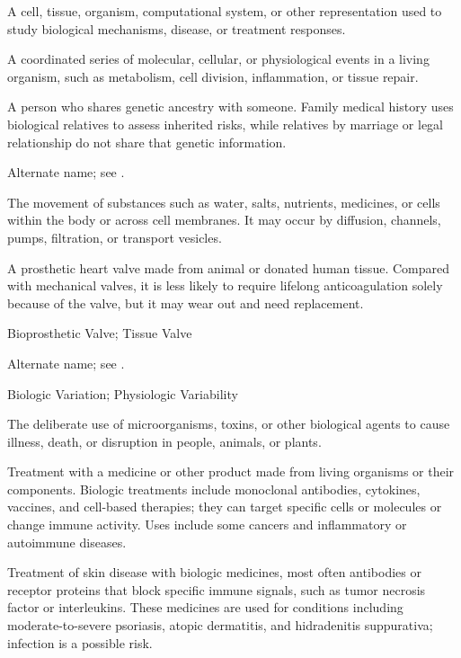  A cell, tissue, organism, computational system, or other representation used to study biological mechanisms, disease, or treatment responses.

 A coordinated series of molecular, cellular, or physiological events in a living organism, such as metabolism, cell division, inflammation, or tissue repair.

 A person who shares genetic ancestry with someone. Family medical history uses biological relatives to assess inherited risks, while relatives by marriage or legal relationship do not share that genetic information.

 Alternate name; see .

 The movement of substances such as water, salts, nutrients, medicines, or cells within the body or across cell membranes. It may occur by diffusion, channels, pumps, filtration, or transport vesicles.

 A prosthetic heart valve made from animal or donated human tissue. Compared with mechanical valves, it is less likely to require lifelong anticoagulation solely because of the valve, but it may wear out and need replacement.

\synonyms
Bioprosthetic Valve; Tissue Valve

 Alternate name; see .

\synonyms
Biologic Variation; Physiologic Variability

 The deliberate use of microorganisms, toxins, or other biological agents to cause illness, death, or disruption in people, animals, or plants.

 Treatment with a medicine or other product made from living organisms or their components. Biologic treatments include monoclonal antibodies, cytokines, vaccines, and cell-based therapies; they can target specific cells or molecules or change immune activity. Uses include some cancers and inflammatory or autoimmune diseases.

 Treatment of skin disease with biologic medicines, most often antibodies or receptor proteins that block specific immune signals, such as tumor necrosis factor or interleukins. These medicines are used for conditions including moderate-to-severe psoriasis, atopic dermatitis, and hidradenitis suppurativa; infection is a possible risk.

